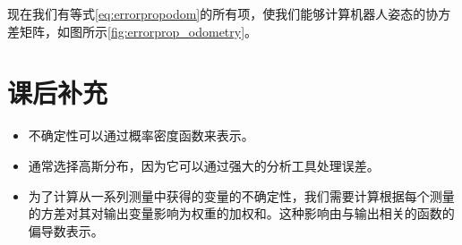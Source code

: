 现在我们有等式\ref{eq:errorpropodom}的所有项，使我们能够计算机器人姿态的协方差矩阵，如图所示\ref{fig:errorprop_odometry}。

\section{课后补充}

\begin{itemize}

\item 不确定性可以通过概率密度函数来表示。
\item 通常选择高斯分布，因为它可以通过强大的分析工具处理误差。
\item 为了计算从一系列测量中获得的变量的不确定性，我们需要计算根据每个测量的方差对其对输出变量影响为权重的加权和。这种影响由与输出相关的函数的偏导数表示。
\end{itemize}

